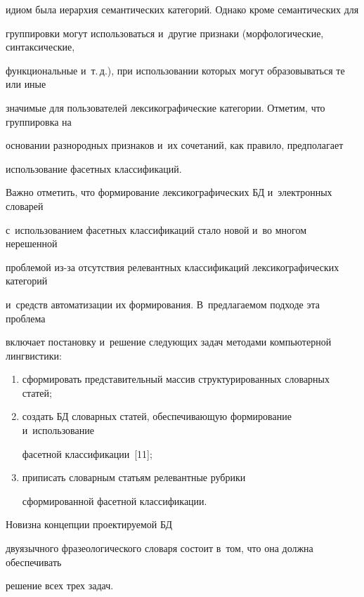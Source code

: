 идиом была иерархия семантических категорий. Однако кроме семантических для 

группировки могут использоваться и~другие признаки (морфологические, синтаксические, 

функциональные и~т.\,д.), при использовании которых могут образовываться те или иные 

значимые для пользователей лексикографические категории. Отметим, что группировка на 

основании разнородных признаков и~их сочетаний, как правило, предполагает 

использование фасетных классификаций.

  

  Важно отметить, что формирование лексикографических БД и~электронных словарей 

с~использованием фасетных классификаций стало новой и~во многом нерешенной 

проблемой из-за отсутствия релевантных классификаций лексикографических категорий 

и~средств автоматизации их формирования. В~предлагаемом подходе эта проблема 

включает постановку и~решение следующих задач методами компьютерной лингвистики: 

\begin{enumerate}[(1)]

\item сформировать представительный массив структурированных словарных статей;

\item создать БД словарных статей, обеспечивающую формирование и~использование 

фасетной классификации~[11];

\item приписать словарным статьям релевантные рубрики 

сформированной фасетной классификации.

\end{enumerate}

 Новизна концепции проектируемой БД 

двуязычного фразеологического словаря состоит в~том, что она должна обеспечивать 

решение всех трех задач.

{



}




